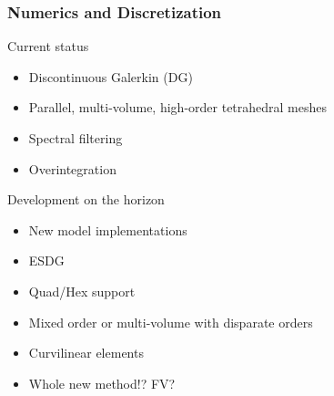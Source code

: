 \begin{frame}\frametitle{Numerics and Discretization}
\begin{center}
Current status
\end{center}
\begin{multicols}{2}
\begin{itemize}
\item Discontinuous Galerkin (DG)
\item Parallel, multi-volume, high-order tetrahedral meshes
\item Spectral filtering
\item Overintegration
\end{itemize}
\end{multicols}
\begin{center}
Development on the horizon
\end{center}
\begin{multicols}{2}
\begin{itemize}
\item New model implementations
\item ESDG 
\item Quad/Hex support 
\item Mixed order or multi-volume with disparate orders
\item Curvilinear elements
\item Whole new method!? FV?
\end{itemize}
\end{multicols}
\end{frame}

